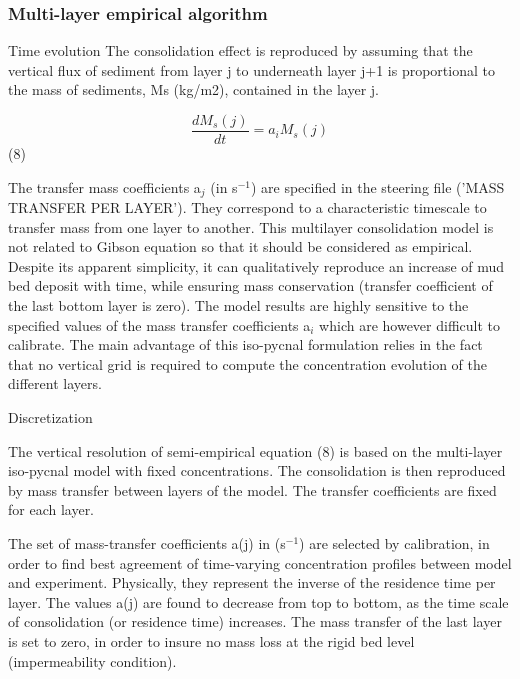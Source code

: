 \subsubsection{Multi-layer empirical algorithm}

Time evolution\newline
The consolidation effect is reproduced by assuming that the vertical flux of
sediment from layer j to underneath layer j+1 is proportional to the mass of
sediments, Ms (kg/m2), contained in the layer j.

\begin{equation*}
\frac{dM_{s} (j)}{dt} =a_{i} M_{s} (j) 
\end{equation*}
\hspace{5mm} \hspace{5mm} (8)

The transfer mass coefficients a$_{j}$ (in s$^{-1}$) are specified in the
steering file ('MASS TRANSFER PER LAYER'). They correspond to a
characteristic timescale to transfer mass from one layer to another.\newline
This multilayer consolidation model is not related to Gibson equation so
that it should be considered as empirical. Despite its apparent simplicity,
it can qualitatively reproduce an increase of mud bed deposit with time,
while ensuring mass conservation (transfer coefficient of the last bottom
layer is zero). The model results are highly sensitive to the specified
values of the mass transfer coefficients a$_{i}$ which are however difficult
to calibrate. The main advantage of this iso-pycnal formulation relies in
the fact that no vertical grid is required to compute the concentration
evolution of the different layers.

Discretization

The vertical resolution of semi-empirical equation (8) is based on the
multi-layer iso-pycnal model with fixed concentrations. The consolidation is
then reproduced by mass transfer between layers of the model. The transfer
coefficients are fixed for each layer.

The set of mass-transfer coefficients a(j) in (s$^{-1}$) are selected by
calibration, in order to find best agreement of time-varying concentration
profiles between model and experiment. Physically, they represent the
inverse of the residence time per layer. The values a(j) are found to
decrease from top to bottom, as the time scale of consolidation (or
residence time) increases. The mass transfer of the last layer is set to
zero, in order to insure no mass loss at the rigid bed level (impermeability
condition).

